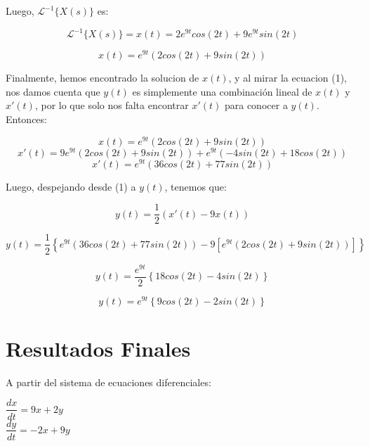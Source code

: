\documentclass[12pt,letterpaper]{article}
\begin{document}
Luego, $\mathcal{L}^{-1}\{X(s)\}$ es:

\begin{equation*}\mathcal{L}^{-1}\{X(s)\} = x(t) = 2e^{9t}cos(2t) + 9e^{9t}sin(2t)\end{equation*}

\begin{equation}x(t) = e^{9t}\left(2cos(2t) + 9sin(2t)\right)\end{equation}

Finalmente, hemos encontrado la solucion de $x(t)$, y al mirar la ecuacion (1), nos damos cuenta que $y(t)$ es simplemente una combinación lineal de $x(t)$ y $x'(t)$, por lo que solo nos falta encontrar $x'(t)$ para conocer a $y(t)$. Entonces:

\begin{equation*}x(t) = e^{9t}\left(2cos(2t) + 9sin(2t)\right)\end{equation*}
\begin{equation*}x'(t) = 9e^{9t}\left(2cos(2t) + 9sin(2t)\right) + e^{9t}\left(-4sin(2t) + 18cos(2t)\right)\end{equation*}
\begin{equation}x'(t) = e^{9t}\left(36cos(2t)+77sin(2t)\right)\end{equation}

Luego, despejando desde (1) a $y(t)$, tenemos que:

\begin{equation}y(t)=\dfrac{1}{2}\left(x'(t)-9x(t)\right)\end{equation}

\begin{equation}y(t) = \dfrac{1}{2}\left\{ e^{9t}\left(36cos(2t)+77sin(2t)\right) - 9\left[ e^{9t}\left(2cos(2t) + 9sin(2t)\right)\right] \right\}\end{equation}

\begin{equation}y(t) = \dfrac{e^{9t}}{2}\left\{ 18cos(2t) - 4sin(2t) \right\}\end{equation}

\begin{equation}y(t) = e^{9t}\left\{ 9cos(2t) - 2sin(2t) \right\}\end{equation}

\section{Resultados Finales}
A partir del sistema de ecuaciones diferenciales:
\begin{center}
	$\dfrac{dx}{dt} = 9 x + 2 y$ \\
	$\dfrac{dy}{dt} = -2 x + 9 y$
\end{center}
\end{document}

